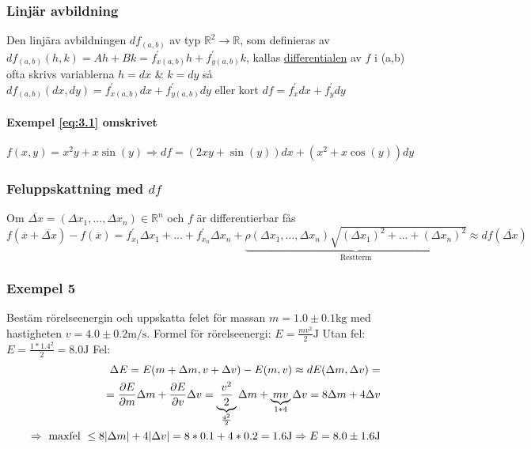 \documentclass{article}
\DeclarePairedDelimiter \abs{\lvert}{\rvert}
\begin{document}
\newpage

\subsubsection{Linjär avbildning}

Den linjära avbildningen \(df_{(a,b)}\) av typ \(\mathbb{R}^2 \rightarrow \mathbb{R}\), som definieras av \(df_{(a,b)}(h,k) = Ah + Bk = f_{x(a,b)}^{\prime}h + f_{y(a,b)}^{\prime}k\), kallas \underline{differentialen} av \(f\) i (a,b) \\
ofta skrivs variablerna \(h=dx\) \& \(k=dy\) så \(df_{(a,b)}(dx,dy) = f_{x(a,b)}^{\prime}dx + f_{y(a,b)}^{\prime}dy\) eller kort \(df = f_{x}^{\prime}dx + f_{y}^{\prime}dy\)

\paragraph{Exempel \eqref{eq:3.1} omskrivet}

\[
	f(x,y) = x^2y + x\sin(y) \Rightarrow df = (2xy+\sin(y))dx + (x^2+x\cos(y))dy
\]

\subsubsection*{Feluppskattning med \(df\)}

Om \(\overline{\Delta x} = (\Delta x_{1},...,\Delta x_{n}) \in \mathbb{R}^n\) och \(f\) är differentierbar fås \(f(\overline{x} + \overline{\Delta x}) - f(\overline{x}) = f_{x_{1}}^{\prime}\Delta x_{1} + ... + f_{x_{n}}^{\prime}\Delta x_{n} + \underbrace{\rho(\Delta x_{1},...,\Delta x_{n})\sqrt{(\Delta x_{1})^2 + ... + (\Delta x_{n})^2}}_{\text{Restterm}} \approx df(\overline{\Delta x})\) 

\subsubsection*{Exempel 5}

Bestäm rörelseenergin och uppskatta felet för massan \(m = 1.0 \pm 0.1\si{\kilogram}\) med hastigheten \(v = 4.0 \pm 0.2\si{\metre\per\second}\). \newline
Formel för rörelseenergi: \(E = \frac{mv^2}{2} \si{\joule}\) \newline
Utan fel: \(E = \frac{1*1.4^2}{2} = 8.0 \si{\joule}\) \newline
Fel: 
\[
\begin{split}
	\Delta E = E(m + \Delta m, v + \Delta v) - E(m,v) \approx dE(\Delta m,\Delta v) = \\
	= \frac{\partial E}{\partial m} \Delta m + \frac{\partial E}{\partial v} \Delta v = \underbrace{\frac{v^2}{2}}_{\frac{4^2}{2}} \Delta m + \underbrace{mv}_{1*4} \Delta v = 8\Delta m + 4\Delta v \\
	\Rightarrow \text{ maxfel } \leq 8\abs{\Delta m} + 4\abs{\Delta v} = 8*0.1 + 4*0.2 = 1.6 \si{\joule} \Rightarrow E = 8.0 \pm 1.6 \si{\joule}
\end{split}
\]
\end{document}
